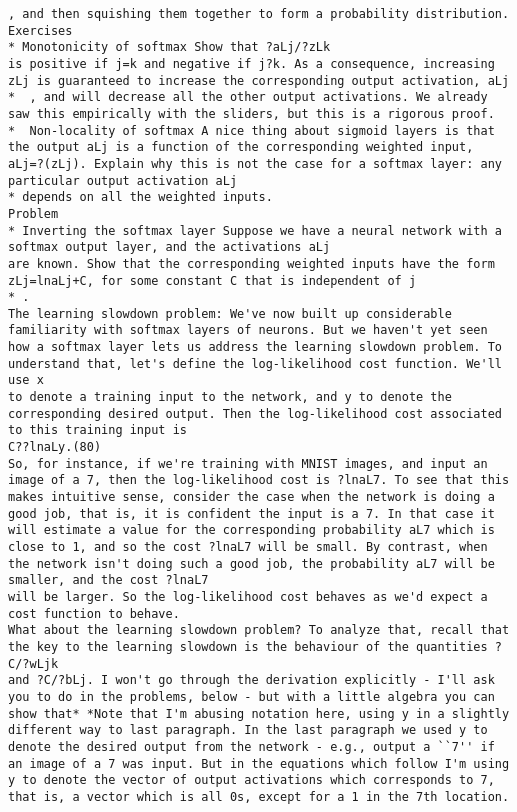 \begin{lstlisting}
, and then squishing them together to form a probability distribution.
Exercises
* Monotonicity of softmax Show that ?aLj/?zLk
is positive if j=k and negative if j?k. As a consequence, increasing zLj is guaranteed to increase the corresponding output activation, aLj
*  , and will decrease all the other output activations. We already saw this empirically with the sliders, but this is a rigorous proof.
*  Non-locality of softmax A nice thing about sigmoid layers is that the output aLj is a function of the corresponding weighted input, aLj=?(zLj). Explain why this is not the case for a softmax layer: any particular output activation aLj
* depends on all the weighted inputs. 
Problem
* Inverting the softmax layer Suppose we have a neural network with a softmax output layer, and the activations aLj
are known. Show that the corresponding weighted inputs have the form zLj=lnaLj+C, for some constant C that is independent of j
* . 
The learning slowdown problem: We've now built up considerable familiarity with softmax layers of neurons. But we haven't yet seen how a softmax layer lets us address the learning slowdown problem. To understand that, let's define the log-likelihood cost function. We'll use x
to denote a training input to the network, and y to denote the corresponding desired output. Then the log-likelihood cost associated to this training input is 
C??lnaLy.(80)
So, for instance, if we're training with MNIST images, and input an image of a 7, then the log-likelihood cost is ?lnaL7. To see that this makes intuitive sense, consider the case when the network is doing a good job, that is, it is confident the input is a 7. In that case it will estimate a value for the corresponding probability aL7 which is close to 1, and so the cost ?lnaL7 will be small. By contrast, when the network isn't doing such a good job, the probability aL7 will be smaller, and the cost ?lnaL7
will be larger. So the log-likelihood cost behaves as we'd expect a cost function to behave.
What about the learning slowdown problem? To analyze that, recall that the key to the learning slowdown is the behaviour of the quantities ?C/?wLjk
and ?C/?bLj. I won't go through the derivation explicitly - I'll ask you to do in the problems, below - but with a little algebra you can show that* *Note that I'm abusing notation here, using y in a slightly different way to last paragraph. In the last paragraph we used y to denote the desired output from the network - e.g., output a ``7'' if an image of a 7 was input. But in the equations which follow I'm using y to denote the vector of output activations which corresponds to 7, that is, a vector which is all 0s, except for a 1 in the 7th location. 

\end{lstlisting}

